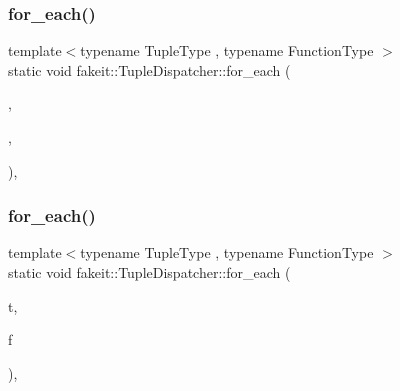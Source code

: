 \mbox{\label{structfakeit_1_1TupleDispatcher_af22c1fae8c695f722da986df9af411ca}} 
\subsubsection{\texorpdfstring{for\_each()}{for\_each()}\hspace{0.1cm}{\footnotesize\ttfamily [26/54]}}
{\footnotesize\ttfamily template$<$typename Tuple\+Type , typename Function\+Type $>$ \\
static void fakeit\+::\+Tuple\+Dispatcher\+::for\+\_\+each (\begin{DoxyParamCaption}\item[{Tuple\+Type \&\&}]{,  }\item[{Function\+Type \&}]{,  }\item[{std\+::integral\+\_\+constant$<$ size\+\_\+t, std\+::tuple\+\_\+size$<$ typename std\+::remove\+\_\+reference$<$ Tuple\+Type $>$\+::type $>$\+::value $>$}]{ }\end{DoxyParamCaption})\hspace{0.3cm}{\ttfamily [inline]}, {\ttfamily [static]}}

\mbox{\label{structfakeit_1_1TupleDispatcher_a8fd292a71795aae0aba215dad28ee4c2}} 
\subsubsection{\texorpdfstring{for\_each()}{for\_each()}\hspace{0.1cm}{\footnotesize\ttfamily [27/54]}}
{\footnotesize\ttfamily template$<$typename Tuple\+Type , typename Function\+Type $>$ \\
static void fakeit\+::\+Tuple\+Dispatcher\+::for\+\_\+each (\begin{DoxyParamCaption}\item[{Tuple\+Type \&\&}]{t,  }\item[{Function\+Type \&}]{f }\end{DoxyParamCaption})\hspace{0.3cm}{\ttfamily [inline]}, {\ttfamily [static]}}

